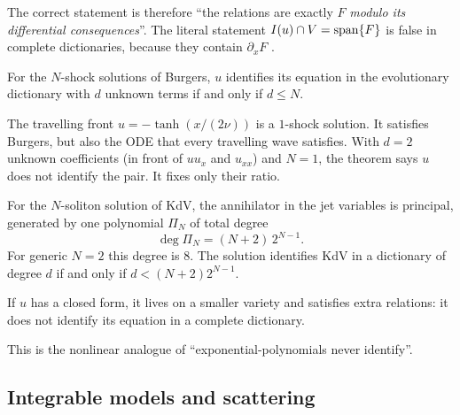 The correct statement is therefore ``the relations are exactly $F$ \emph{modulo its differential consequences}''. The literal statement $I(u)\cap V=\operatorname{span}\{F\}$ is false in complete dictionaries, because they contain $\partial_xF$  \proved.

\begin{theorem}\label{thm:burgersN}
For the $N$-shock solutions of Burgers, $u$ identifies its equation in the evolutionary dictionary with $d$ unknown terms if and only if $d\le N$.

\end{theorem}

\begin{example}
The travelling front $u=-\tanh(x/(2\nu))$ is a $1$-shock solution. It satisfies Burgers, but also the ODE that every travelling wave satisfies. With $d=2$ unknown coefficients (in front of $uu_x$ and $u_{xx}$) and $N=1$, the theorem says $u$ does not identify the pair. It fixes only their ratio.
\end{example}

\begin{theorem}\label{thm:kdv}
For the $N$-soliton solution of KdV, the annihilator in the jet variables is principal, generated by one polynomial $\Pi_N$ of total degree
\[
\deg\Pi_N=(N+2)\,2^{N-1}.
\]
For generic $N=2$ this degree is $8$. The solution identifies KdV in a dictionary of degree $d$ if and only if $d<(N+2)2^{N-1}$.

\end{theorem}

\begin{proposition}
If $u$ has a closed form, it lives on a smaller variety and satisfies extra relations: it does not identify its equation in a complete dictionary.

\end{proposition}

This is the nonlinear analogue of ``exponential-polynomials never identify''.

\subsection{Integrable models and scattering}


